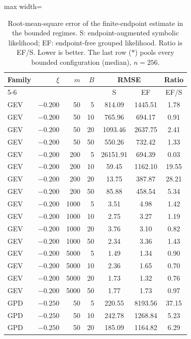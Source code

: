 \begin{table}[t]
\centering
\scriptsize
\renewcommand{\tabcolsep}{3pt}
\caption{Root-mean-square error of the finite-endpoint estimate in the bounded regimes. S: endpoint-augmented symbolic likelihood; EF: endpoint-free grouped likelihood. Ratio is EF/S. Lower is better. The last row ($*$) pools every bounded configuration (median), $n = 256$.}
\label{tab:endpoint}
\begin{adjustbox}{max width=\columnwidth}
\begin{tabular}{lrrr *{3}{c}}
\toprule
Family & $\xi$ & $m$ & $B$ & \multicolumn{2}{c}{RMSE} & Ratio \\
\cmidrule(lr){5-6}
& & & & S & EF & EF/S \\
\midrule
GEV & $-0.200$ &   50 &  5 &   814.09 & 1445.51 &  1.78 \\
GEV & $-0.200$ &   50 & 10 &   765.96 &  694.17 &  0.91 \\
GEV & $-0.200$ &   50 & 20 &  1093.46 & 2637.75 &  2.41 \\
GEV & $-0.200$ &   50 & 50 &   550.26 &  732.42 &  1.33 \\
GEV & $-0.200$ &  200 &  5 & 26151.91 &  694.39 &  0.03 \\
GEV & $-0.200$ &  200 & 10 &    59.45 & 1162.10 & 19.55 \\
GEV & $-0.200$ &  200 & 20 &    13.75 &  387.87 & 28.21 \\
GEV & $-0.200$ &  200 & 50 &    85.88 &  458.54 &  5.34 \\
GEV & $-0.200$ & 1000 &  5 &     3.51 &    4.98 &  1.42 \\
GEV & $-0.200$ & 1000 & 10 &     2.75 &    3.27 &  1.19 \\
GEV & $-0.200$ & 1000 & 20 &     3.76 &    3.10 &  0.82 \\
GEV & $-0.200$ & 1000 & 50 &     2.34 &    3.36 &  1.43 \\
GEV & $-0.200$ & 5000 &  5 &     1.49 &    1.34 &  0.90 \\
GEV & $-0.200$ & 5000 & 10 &     2.36 &    1.65 &  0.70 \\
GEV & $-0.200$ & 5000 & 20 &     1.73 &    1.32 &  0.76 \\
GEV & $-0.200$ & 5000 & 50 &     1.77 &    1.73 &  0.97 \\
\midrule
GPD & $-0.250$ &   50 &  5 &   220.55 & 8193.56 & 37.15 \\
GPD & $-0.250$ &   50 & 10 &   242.78 & 1268.84 &  5.23 \\
GPD & $-0.250$ &   50 & 20 &   185.09 & 1164.82 &  6.29 \\

\end{tabular}
\end{adjustbox}
\end{table}
